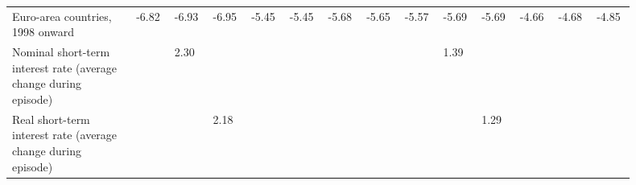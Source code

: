 \begin{table}[!htbp]
\begin{threeparttable}
\begin{tabular}{@{}>{\raggedright\arraybackslash}p{0.18\linewidth}*{13}{>{\centering\arraybackslash}p{0.055\linewidth}}@{}}
Euro-area countries, 1998 onward & \makecell[c]{\rule{0pt}{2.6ex} -6.82 \\ \rule{0pt}{2.0ex} \phantom{\textsuperscript{***}}} & \makecell[c]{\rule{0pt}{2.6ex} -6.93 \\ \rule{0pt}{2.0ex} \phantom{\textsuperscript{***}}} & \makecell[c]{\rule{0pt}{2.6ex} -6.95 \\ \rule{0pt}{2.0ex} \phantom{\textsuperscript{***}}} & \makecell[c]{\rule{0pt}{2.6ex} -5.45 \\ \rule{0pt}{2.0ex} \phantom{\textsuperscript{***}}} & \makecell[c]{\rule{0pt}{2.6ex} -5.45 \\ \rule{0pt}{2.0ex} \phantom{\textsuperscript{***}}} & \makecell[c]{\rule{0pt}{2.6ex} -5.68 \\ \rule{0pt}{2.0ex} \phantom{\textsuperscript{***}}} & \makecell[c]{\rule{0pt}{2.6ex} -5.65 \\ \rule{0pt}{2.0ex} \phantom{\textsuperscript{***}}} & \makecell[c]{\rule{0pt}{2.6ex} -5.57 \\ \rule{0pt}{2.0ex} \phantom{\textsuperscript{***}}} & \makecell[c]{\rule{0pt}{2.6ex} -5.69 \\ \rule{0pt}{2.0ex} \phantom{\textsuperscript{***}}} & \makecell[c]{\rule{0pt}{2.6ex} -5.69 \\ \rule{0pt}{2.0ex} \phantom{\textsuperscript{***}}} & \makecell[c]{\rule{0pt}{2.6ex} -4.66 \\ \rule{0pt}{2.0ex} \phantom{\textsuperscript{***}}} & \makecell[c]{\rule{0pt}{2.6ex} -4.68 \\ \rule{0pt}{2.0ex} \phantom{\textsuperscript{***}}} & \makecell[c]{\rule{0pt}{2.6ex} -4.85 \\ \rule{0pt}{2.0ex} \phantom{\textsuperscript{***}}} \\
Nominal short-term interest rate (average change during episode) &  & \makecell[c]{\rule{0pt}{2.6ex} 2.30 \\ \rule{0pt}{2.0ex} \phantom{\textsuperscript{***}}} &  &  &  &  &  &  & \makecell[c]{\rule{0pt}{2.6ex} 1.39 \\ \rule{0pt}{2.0ex} \phantom{\textsuperscript{***}}} &  &  &  &  \\
Real short-term interest rate (average change during episode) &  &  & \makecell[c]{\rule{0pt}{2.6ex} 2.18 \\ \rule{0pt}{2.0ex} \phantom{\textsuperscript{***}}} &  &  &  &  &  &  & \makecell[c]{\rule{0pt}{2.6ex} 1.29 \\ \rule{0pt}{2.0ex} \phantom{\textsuperscript{***}}} &  &  &  \\

\end{tabular}
\end{threeparttable}
\end{table}
